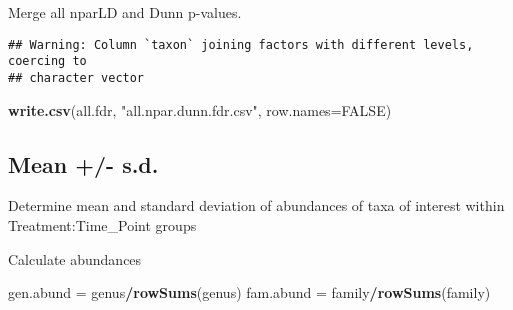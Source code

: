 \documentclass[]{article}
\newenvironment{Shaded}{\begin{snugshade}}{\end{snugshade}}
\newcommand{\KeywordTok}[1]{\textcolor[rgb]{0.13,0.29,0.53}{\textbf{#1}}}
\newcommand{\DataTypeTok}[1]{\textcolor[rgb]{0.13,0.29,0.53}{#1}}
\newcommand{\StringTok}[1]{\textcolor[rgb]{0.31,0.60,0.02}{#1}}
\newcommand{\OtherTok}[1]{\textcolor[rgb]{0.56,0.35,0.01}{#1}}
\newcommand{\OperatorTok}[1]{\textcolor[rgb]{0.81,0.36,0.00}{\textbf{#1}}}
\newcommand{\NormalTok}[1]{#1}
\begin{document}
Merge all nparLD and Dunn p-values.

\begin{Shaded}
\end{Shaded}

\begin{verbatim}
## Warning: Column `taxon` joining factors with different levels, coercing to
## character vector
\end{verbatim}

\begin{Shaded}
\begin{Highlighting}[]
\KeywordTok{write.csv}\NormalTok{(all.fdr, }\StringTok{"all.npar.dunn.fdr.csv"}\NormalTok{, }\DataTypeTok{row.names=}\OtherTok{FALSE}\NormalTok{)}
\end{Highlighting}
\end{Shaded}

\subsection{Mean +/- s.d.}\label{mean---s.d.}

Determine mean and standard deviation of abundances of taxa of interest
within Treatment:Time\_Point groups

Calculate abundances

\begin{Shaded}
\begin{Highlighting}[]
\NormalTok{gen.abund =}\StringTok{ }\NormalTok{genus}\OperatorTok{/}\KeywordTok{rowSums}\NormalTok{(genus)}
\NormalTok{fam.abund =}\StringTok{ }\NormalTok{family}\OperatorTok{/}\KeywordTok{rowSums}\NormalTok{(family)}
\end{Highlighting}
\end{Shaded}
\end{document}
